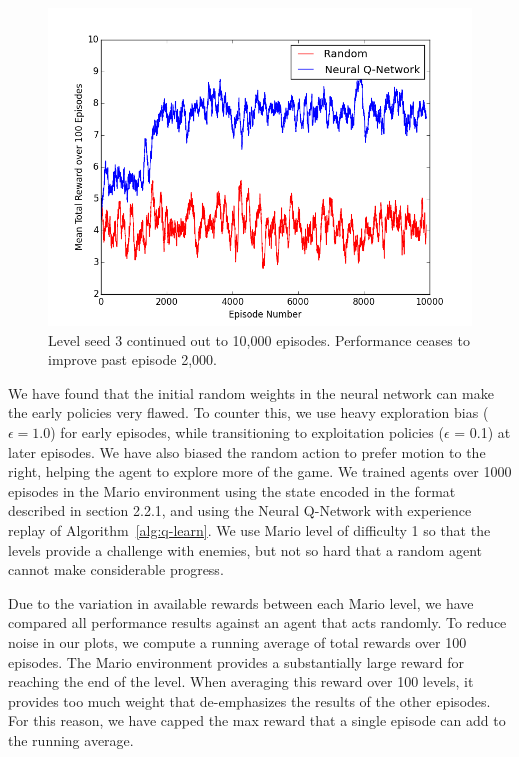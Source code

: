 \documentclass{article}
\begin{document}
 \begin{figure}
\begin{center}
\includegraphics[scale=0.42]{10000eps.png}
\caption{Level seed 3 continued out to 10,000 episodes. Performance ceases to improve past episode 2,000.}
\end{center}
\end{figure}
 
We have found that the initial random weights in the neural network can make the early policies very flawed. To counter this, we use heavy exploration bias ($\epsilon = 1.0$) for early episodes, while transitioning to exploitation policies ($\epsilon$ = 0.1) at later episodes. We have also biased the random action to prefer motion to the right, helping the agent to explore more of the game. We trained agents over 1000 episodes in the Mario environment using the state encoded in the format described in section 2.2.1, and using the Neural Q-Network with experience replay of Algorithm~\ref{alg:q-learn}. We use Mario level of difficulty 1 so that the levels provide a challenge with enemies, but not so hard that a random agent cannot make considerable progress.
 
 Due to the variation in available rewards between each Mario level, we have compared all performance results against an agent that acts randomly. To reduce noise in our plots, we compute a running average of total rewards over 100 episodes. The Mario environment provides a substantially large reward for reaching the end of the level. When averaging this reward over 100 levels, it provides too much weight that de-emphasizes the results of the other episodes. For this reason, we have capped the max reward that a single episode can add to the running average.
 
\end{document}
